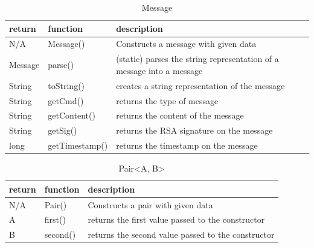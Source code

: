 \begin{table}[h]
    \centering
    \begin{tabular}{p{1cm}p{2.6cm}p{9cm}}
    return  & function       & description\\ \hline
    N/A     & Message()      & Constructs a message with given data\\
    
    Message & parse()        & (static) parses the string representation of a message into a message\\
    
    String  & toString()     & creates a string representation of the message\\
    String  & getCmd()       & returns the type of message\\
    String  & getContent()   & returns the content of the message\\
    String  & getSig()       & returns the RSA signature on the message\\
    long    & getTimestamp() & returns the timestamp on the message\\
    \end{tabular}
    \caption{Message}
\end{table}

\begin{table}[h]
    \centering
    \begin{tabular}{p{1cm}p{2cm}p{9cm}}
    return & function & description\\ \hline
    
    N/A    & Pair()   & Constructs a pair with given data\\
    A      & first()  & returns the first value passed to the constructor\\
    B      & second() & returns the second value passed to the constructor\\
    \end{tabular}
    \caption{Pair\textless A, B\textgreater }
\end{table}

\clearpage
